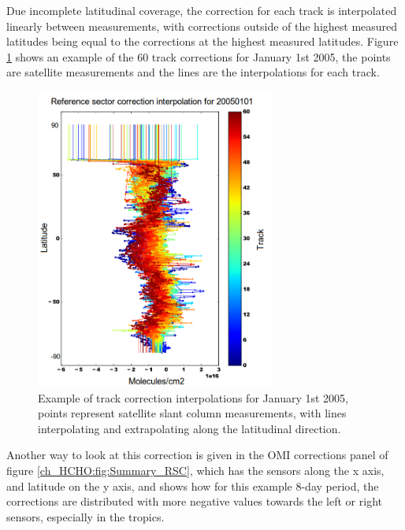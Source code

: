     Due incomplete latitudinal coverage, the correction for each track is interpolated linearly between measurements, with corrections outside of the highest measured latitudes being equal to the corrections at the highest measured latitudes.
    Figure \ref{ch_HCHO:fig:track_correction_interpolations} shows an example of the 60 track corrections for January 1st 2005, the points are satellite measurements and the lines are the interpolations for each track.
    \begin{figure}[!htbp]\begin{center}
      \includegraphics[width=0.7\textwidth]{Figures/HCHO/track_corrections20050101.png}
      \caption{Example of track correction interpolations for January 1st 2005, points represent satellite slant column measurements, with lines interpolating and extrapolating along the latitudinal direction.}
      \label{ch_HCHO:fig:track_correction_interpolations}
    \end{center}\end{figure}
    
    Another way to look at this correction is given in the OMI corrections panel of figure \ref{ch_HCHO:fig:Summary_RSC}, which has the sensors along the x axis, and latitude on the y axis, and shows how for this example 8-day period, the corrections are distributed with more negative values towards the left or right sensors, especially in the tropics.
    
